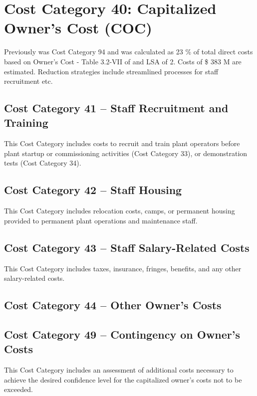 \section{Cost Category 40: Capitalized Owner’s Cost (COC)}

Previously was Cost Category 94 and was calculated as 23 \% of total direct costs based on Owner's Cost - Table 3.2-VII of \cite{SCH78} and LSA of 2. Costs of \$ 383 M are estimated. Reduction strategies include streamlined processes for staff recruitment etc. 

\subsection*{Cost Category 41 – Staff Recruitment and Training}
This Cost Category includes costs to recruit and train plant operators before plant startup or commissioning activities (Cost Category 33), or demonstration tests (Cost Category 34).

\subsection*{Cost Category 42 – Staff Housing}
This Cost Category includes relocation costs, camps, or permanent housing provided to permanent plant operations and maintenance staff.

\subsection*{Cost Category 43 – Staff Salary-Related Costs}
This Cost Category includes taxes, insurance, fringes, benefits, and any other salary-related costs.

\subsection*{Cost Category 44 – Other Owner’s Costs}

\subsection*{Cost Category 49 – Contingency on Owner’s Costs}
This Cost Category includes an assessment of additional costs necessary to achieve the desired confidence level for the capitalized owner’s costs not to be exceeded.
